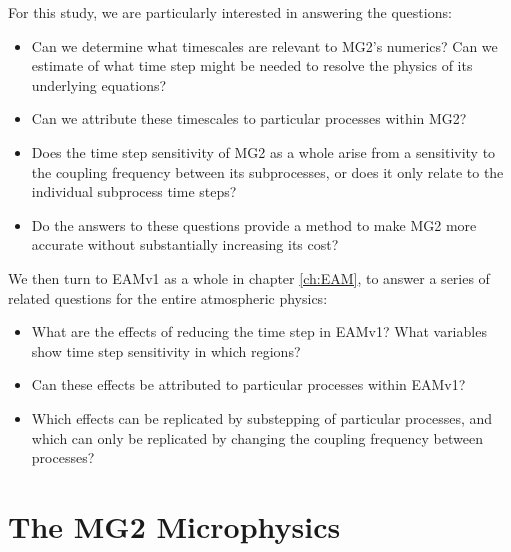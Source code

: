 \documentclass [11pt, proquest] {uwthesis}[2020/02/24]
\begin{document}
For this study, we are particularly interested in answering the questions:

\begin{itemize}
    \item Can we determine what timescales are relevant to MG2's numerics? Can we estimate of what time step might be needed to resolve the physics of its underlying equations?
    \item Can we attribute these timescales to particular processes within MG2?
    \item Does the time step sensitivity of MG2 as a whole arise from a sensitivity to the coupling frequency between its subprocesses, or does it only relate to the individual subprocess time steps?
    \item Do the answers to these questions provide a method to make MG2 more accurate without substantially increasing its cost?
\end{itemize}

We then turn to EAMv1 as a whole in chapter \ref{ch:EAM}, to answer a series of related questions for the entire atmospheric physics:

\begin{itemize}
    \item What are the effects of reducing the time step in EAMv1? What variables show time step sensitivity in which regions?
    \item Can these effects be attributed to particular processes within EAMv1?
    \item Which effects can be replicated by substepping of particular processes, and which can only be replicated by changing the coupling frequency between processes?
\end{itemize}

\chapter{The MG2 Microphysics} \label{ch:MG2}
\end{document}
